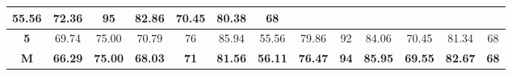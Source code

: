 \begin{table}[H]
{\begin{tabular}{c|cccc|cccc|cccc|}
			\multicolumn{1}{c|}{55.56} &
			\multicolumn{1}{c|}{72.36} &
			95 &
			\multicolumn{1}{c|}{82.86} &
			\multicolumn{1}{c|}{70.45} &
			\multicolumn{1}{c|}{80.38} &
			68 \\ \hline
			\multicolumn{1}{|c|}{\textbf{5}} &
			\multicolumn{1}{c|}{69.74} &
			\multicolumn{1}{c|}{75.00} &
			\multicolumn{1}{c|}{70.79} &
			76 &
			\multicolumn{1}{c|}{85.94} &
			\multicolumn{1}{c|}{55.56} &
			\multicolumn{1}{c|}{79.86} &
			92 &
			\multicolumn{1}{c|}{84.06} &
			\multicolumn{1}{c|}{70.45} &
			\multicolumn{1}{c|}{81.34} &
			68 \\ \hline
			\multicolumn{1}{|c|}{{\color[HTML]{00009B} \textbf{M}}} &
			\multicolumn{1}{c|}{{\color[HTML]{00009B} \textbf{66.29}}} &
			\multicolumn{1}{c|}{{\color[HTML]{00009B} \textbf{75.00}}} &
			\multicolumn{1}{c|}{{\color[HTML]{00009B} \textbf{68.03}}} &
			{\color[HTML]{00009B} \textbf{71}} &
			\multicolumn{1}{c|}{{\color[HTML]{00009B} \textbf{81.56}}} &
			\multicolumn{1}{c|}{{\color[HTML]{00009B} \textbf{56.11}}} &
			\multicolumn{1}{c|}{{\color[HTML]{00009B} \textbf{76.47}}} &
			{\color[HTML]{00009B} \textbf{94}} &
			\multicolumn{1}{c|}{{\color[HTML]{00009B} \textbf{85.95}}} &
			\multicolumn{1}{c|}{{\color[HTML]{00009B} \textbf{69.55}}} &
			\multicolumn{1}{c|}{{\color[HTML]{00009B} \textbf{82.67}}} &
			{\color[HTML]{00009B} \textbf{68}} \\ \hline
		\end{tabular}%
	}
\end{table}